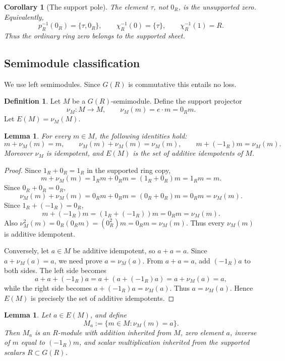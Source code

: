 \documentclass[11pt]{article}
\theoremstyle{plain}
\newtheorem{lemma}[theorem]{Lemma}
\newtheorem{corollary}[theorem]{Corollary}
\theoremstyle{definition}
\newtheorem{definition}[theorem]{Definition}
\numberwithin{equation}{section}
\begin{document}
\begin{corollary}[The support pole]
The element \(\tau\), not \(0_R\), is the unsupported zero.  Equivalently,
\[
 p_R^{-1}(0_R)=\{\tau,0_R\},
 \qquad
 \chi_R^{-1}(0)=\{\tau\},
 \qquad
 \chi_R^{-1}(1)=R.
\]
Thus the ordinary ring zero belongs to the supported sheet.
\end{corollary}

\subsection{Semimodule classification}

We use left semimodules.  Since \(G(R)\) is commutative this entails no loss.

\begin{definition}
Let \(M\) be a \(G(R)\)-semimodule.  Define the support projector
\[
 \nu_M:M\to M,
 \qquad
 \nu_M(m)=e\cdot m=0_Rm.
\]
Let \(E(M)=\nu_M(M)\).
\end{definition}

\begin{lemma}\label{lem:semimodule-basic}
For every \(m\in M\), the following identities hold:
\[
 m+\nu_M(m)=m,
 \qquad
 \nu_M(m)+\nu_M(m)=\nu_M(m),
 \qquad
 m+(-1_R)m=\nu_M(m).
\]
Moreover \(\nu_M\) is idempotent, and \(E(M)\) is the set of additive idempotents of \(M\).
\end{lemma}

\begin{proof}
Since \(1_R+0_R=1_R\) in the supported ring copy,
\[
 m+\nu_M(m)=1_Rm+0_Rm=(1_R+0_R)m=1_Rm=m.
\]
Since \(0_R+0_R=0_R\),
\[
 \nu_M(m)+\nu_M(m)=0_Rm+0_Rm=(0_R+0_R)m=0_Rm=\nu_M(m).
\]
Since \(1_R+(-1_R)=0_R\),
\[
 m+(-1_R)m=(1_R+(-1_R))m=0_Rm=\nu_M(m).
\]
Also \(\nu_M^2(m)=0_R(0_Rm)=(0_R^2)m=0_Rm=\nu_M(m)\).  Thus every \(\nu_M(m)\) is additive idempotent.

Conversely, let \(a\in M\) be additive idempotent, so \(a+a=a\).  Since \(a+\nu_M(a)=a\), we need prove \(a=\nu_M(a)\).  From \(a+a=a\), add \((-1_R)a\) to both sides.  The left side becomes
\[
 a+a+(-1_R)a=a+(a+(-1_R)a)=a+\nu_M(a)=a,
\]
while the right side becomes \(a+(-1_R)a=\nu_M(a)\).  Thus \(a=\nu_M(a)\).  Hence \(E(M)\) is precisely the set of additive idempotents.
\end{proof}

\begin{lemma}\label{lem:fibers-modules}
Let \(a\in E(M)\), and define
\[
 M_a:=\{m\in M:\nu_M(m)=a\}.
\]
Then \(M_a\) is an \(R\)-module with addition inherited from \(M\), zero element \(a\), inverse of \(m\) equal to \((-1_R)m\), and scalar multiplication inherited from the supported scalars \(R\subset G(R)\).
\end{lemma}
\end{document}
